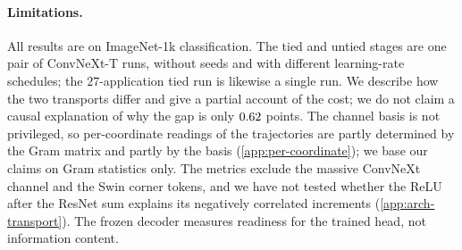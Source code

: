\paragraph{Limitations.}
All results are on ImageNet-1k classification.
The tied and untied stages are one pair of ConvNeXt-T runs, without seeds and with
different learning-rate schedules; the $27$-application tied run is likewise a single
run.
We describe how the two transports differ and give a partial account of the cost; we
do not claim a causal explanation of why the gap is only $0.62$ points.
The channel basis is not privileged, so per-coordinate readings of the trajectories
are partly determined by the Gram matrix and partly by the basis
(\cref{app:per-coordinate}); we base our claims on Gram statistics only.
The metrics exclude the massive ConvNeXt channel and the Swin corner tokens, and we
have not tested whether the ReLU after the ResNet sum explains its negatively
correlated increments (\cref{app:arch-transport}).
The frozen decoder measures readiness for the trained head, not information content.
